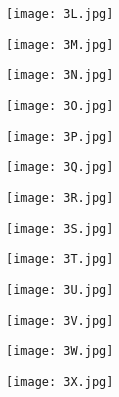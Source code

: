 \documentclass[11pt]{article}
\begin{document}
\begin{figure}[H]
    \centering
    \texttt{[image: 3L.jpg]}
\end{figure}

\begin{figure}[H]
    \centering
    \texttt{[image: 3M.jpg]}
\end{figure}

\begin{figure}[H]
    \centering
    \texttt{[image: 3N.jpg]}
\end{figure}

\begin{figure}[H]
    \centering
    \texttt{[image: 3O.jpg]}
\end{figure}

\begin{figure}[H]
    \centering
    \texttt{[image: 3P.jpg]}
\end{figure}
  
\begin{figure}[H]
    \centering
    \texttt{[image: 3Q.jpg]}
\end{figure}

\begin{figure}[H]
    \centering
    \texttt{[image: 3R.jpg]}
\end{figure}

\begin{figure}[H]
    \centering
    \texttt{[image: 3S.jpg]}
\end{figure}

\begin{figure}[H]
    \centering
    \texttt{[image: 3T.jpg]}
\end{figure}

\begin{figure}[H]
    \centering
    \texttt{[image: 3U.jpg]}
\end{figure}

\begin{figure}[H]
    \centering
    \texttt{[image: 3V.jpg]}
\end{figure}

\begin{figure}[H]
    \centering
    \texttt{[image: 3W.jpg]}
\end{figure}

\begin{figure}[H]
    \centering
    \texttt{[image: 3X.jpg]}
\end{figure}
\end{document}
